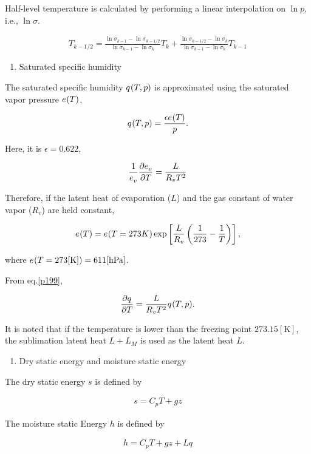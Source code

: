Half-level temperature is calculated by performing a linear
interpolation on \(\ln p\), i.e., \(\ln \sigma\).

\begin{eqnarray}
  T_{k-1/2} = \frac{\ln \sigma_{k-1} - \ln \sigma_{k-1/2}}
                   {\ln \sigma_{k-1} - \ln \sigma_k      } T_k
            + \frac{\ln \sigma_{k-1/2} - \ln \sigma_k}
                   {\ln \sigma_{k-1} - \ln \sigma_k      } T_{k-1}
\end{eqnarray}

\begin{enumerate}
\def\labelenumi{\arabic{enumi}.}
\setcounter{enumi}{4}
\tightlist
\item
  Saturated specific humidity
\end{enumerate}

The saturated specific humidity \(q^{\*}(T,p)\) is approximated using
the saturated vapor pressure \(e^{\*}(T)\),

\begin{eqnarray}
q^{\*}(T,p) = \frac{\epsilon e^{\*}(T)}{p} .
\end{eqnarray}

Here, it is \(\epsilon=0.622\),

\begin{eqnarray}
\frac{1}{e^{\*}_v} \frac{\partial{e^{\*}_v}}{\partial {T}} = \frac{L}{R_v T^2} \label{p199}
\end{eqnarray}

Therefore, if the latent heat of evaporation (\(L\)) and the gas
constant of water vapor (\(R_v\)) are held constant,

\begin{eqnarray}
  e^{\*}(T) = e^{\*}(T=273{K})
                      \exp \left[ \frac{L}{R_v}
                            \left( \frac{1}{273} - \frac{1}{T} \right)
                       \right] ,
\end{eqnarray}

where \(e^{\*}(T=273 \mathrm{[K]}) = 611 \mathrm{[hPa]}\).

From eq.\ref{p199},

\begin{eqnarray}
\frac{\partial{q^{\*}}}{\partial {T}} = \frac{L}{R_v T^2} q^{\*}(T,p) .
\end{eqnarray}

It is noted that if the temperature is lower than the freezing point
\(273.15 \mathrm{[K]}\), the sublimation latent heat \(L+L_M\) is used
as the latent heat \(L\).

\begin{enumerate}
\def\labelenumi{\arabic{enumi}.}
\setcounter{enumi}{5}
\tightlist
\item
  Dry static energy and moisture static energy
\end{enumerate}

The dry static energy \(s\) is defined by

\begin{eqnarray}
  s = C_p T + g z
\end{eqnarray}

The moisture static Energy \(h\) is defined by

\begin{eqnarray}
  h = C_p T + g z + L q
\end{eqnarray}
